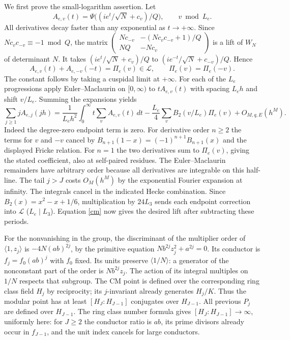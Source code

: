 \documentclass[11pt]{article}
\begin{document}
We first prove the small-logarithm assertion. Let
\[
 A_{e,v}(t)=\Psi\big((i e^t/\sqrt N+c_v)/Q\big),
 \qquad v\bmod L_e.
\]
All derivatives decay faster than any exponential as $t\to+\infty$. Since $Nc_vc_{-v}\equiv-1\bmod Q$, the matrix
$\left(\begin{smallmatrix}Nc_{-v}&-(Nc_vc_{-v}+1)/Q\\NQ&-Nc_v\end{smallmatrix}\right)$ is a lift of $W_N$ of determinant $N$. It takes $(i e^t/\sqrt N+c_v)/Q$ to $(i e^{-t}/\sqrt N+c_{-v})/Q$. Hence
\[
 A_{e,v}(t)+A_{e,-v}(-t)=\Pi_e(v)\in\mathcal L,\qquad
 \Pi_e(v)=\Pi_e(-v).
\]
The constant follows by taking a cuspidal limit at $+\infty$. For each of the $L_e$ progressions apply Euler--Maclaurin on $[0,\infty)$ to $tA_{e,v}(t)$ with spacing $L_e h$ and shift $v/L_e$. Summing the expansions yields
\[
 \sum_{j\ge1}j A_{e,j}(jh)=
 \frac1{L_e h^2}\int_0^\infty t\sum_v A_{e,v}(t)\,dt
 -\frac{L_e}4\sum_v B_2(v/L_e)\Pi_e(v)+O_{M,q,E}(h^M).
\]
Indeed the degree-zero endpoint term is zero. For derivative order $n\ge2$ the terms for $v$ and $-v$ cancel by $B_{n+1}(1-x)=(-1)^{n+1}B_{n+1}(x)$ and the displayed Fricke relation. For $n=1$ the two derivatives sum to $\Pi_e(v)$, giving the stated coefficient, also at self-paired residues. The Euler--Maclaurin remainders have arbitrary order because all derivatives are integrable on this half-line. The tail $j>J$ costs $O_M(h^M)$ by the exponential Fourier expansion at infinity. The integrals cancel in the indicated Hecke combination. Since $B_2(x)=x^2-x+1/6$, multiplication by $24 L_3$ sends each endpoint correction into $\mathcal L$ ($L_e\mid L_3$). Equation \eqref{cm} now gives the desired lift after subtracting these periods.

For the nonvanishing in the group, the discriminant of the multiplier order of $\langle1,z_j\rangle$ is $-4N(ab)^{2j}$, by the primitive equation $Nb^{2j}z_j^2+a^{2j}=0$. Its conductor is $f_j=f_0(ab)^j$ with $f_0$ fixed. Its units preserve $\langle1/N\rangle$: a generator of the nonconstant part of the order is $Nb^{2j}z_j$. The action of its integral multiples on $1/N$ respects that subgroup. The CM point is defined over the corresponding ring class field $H_j$ by reciprocity; its $j$-invariant already generates $H_j/K$. Thus the modular point has at least $[H_J:H_{J-1}]$ conjugates over $H_{J-1}$. All previous $P_j$ are defined over $H_{J-1}$. The ring class number formula gives $[H_J:H_{J-1}]\to\infty$, uniformly here: for $J\ge2$ the conductor ratio is $ab$, its prime divisors already occur in $f_{J-1}$, and the unit index cancels for large conductors.
\end{document}
